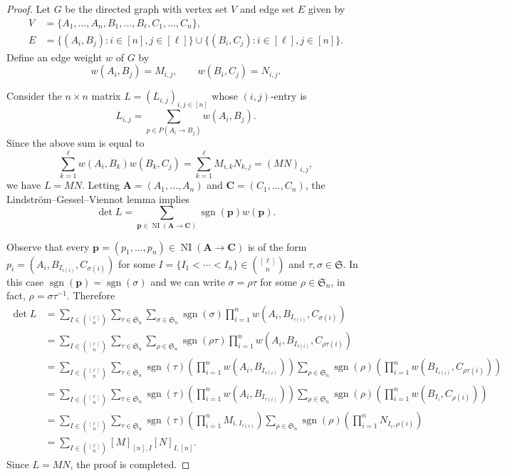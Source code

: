 \documentclass[oneside]{book}
\numberwithin{equation}{section}
\theoremstyle{definition}
\newcommand\NI{\operatorname{NI}}
\newcommand\sgn{\operatorname{sgn}}
\newcommand\sym{\mathfrak{S}}
\renewcommand\vec[1]{\mathbf{#1}}
\begin{document}
\begin{proof}
Let \( G \) be the directed graph with vertex set \( V \)
and edge set \( E \) given by
\begin{align*}
  V &= \{A_1,\dots,A_n, B_1,\dots,B_\ell, C_1,\dots,C_n\}, \\
  E &= \{(A_i,B_j): i\in [n], j\in [\ell]\} \cup
      \{(B_i,C_j): i\in [\ell], j\in [n]\}.
\end{align*}
Define an edge weight \( w \) of \( G \) by
\[
  w(A_i,B_j) = M_{i,j}, \qquad w(B_i,C_j) = N_{i,j}.
\]

Consider the \( n\times n \) matrix \( L=(L_{i,j})_{i,j\in[n]} \)
whose \( (i,j) \)-entry is
\[
  L_{i,j} = \sum_{p\in P(A_i\to B_j)} w(A_i,B_j).
\]
Since the above sum is equal to
\[
    \sum_{k=1}^{\ell} w(A_i,B_k) w(B_k,C_j)
  = \sum_{k=1}^{\ell} M_{i,k} N_{k,j} = (MN)_{i,j},
\]
we have \( L = MN \). Letting \( \vec A = (A_1,\dots,A_n) \) and
\( \vec C = (C_1,\dots,C_n) \), the Lindstr\"om--Gessel--Viennot lemma
implies
\[
  \det L = \sum_{\vec p\in \NI(\vec A \to \vec C)} 
  \sgn(\vec p) w(\vec p).
\]

Observe that every
\( \vec p = (p_1,\dots,p_{n})\in \NI(\vec A \to \vec C) \) is of the
form \( p_i = (A_i, B_{I_{\tau(i)}}, C_{\sigma(i)}) \) for some
\( I = \{I_1 < \cdots <I_n\}\in \binom{[\ell]}{n} \) and
\( \tau,\sigma\in \sym \). In this case
\( \sgn(\vec p) = \sgn(\sigma) \) and we can write
\( \sigma=\rho\tau \) for some \( \rho\in \sym_n \), in fact,
\( \rho = \sigma\tau^{-1} \).
Therefore
\begin{align*}
  \det L
  &= \sum_{I\in \binom{[\ell]}{n}} \sum_{\tau\in\sym_n} \sum_{\sigma\in\sym_n}  \sgn(\sigma) \prod_{i=1}^{n} w(A_i,B_{I_{\tau(i)}}, C_{\sigma(i)})\\
  &= \sum_{I\in \binom{[\ell]}{n}} \sum_{\tau\in\sym_n} \sum_{\rho\in\sym_n}  \sgn(\rho\tau) \prod_{i=1}^{n} w(A_i,B_{I_{\tau(i)}}, C_{\rho\tau(i)})\\
  &= \sum_{I\in \binom{[\ell]}{n}} \sum_{\tau\in\sym_n} \sgn(\tau) \left( \prod_{i=1}^{n} w(A_i,B_{I_{\tau(i)}}) \right)
    \sum_{\rho\in\sym_n}  \sgn(\rho) \left( \prod_{i=1}^{n} w(B_{I_{\tau(i)}}, C_{\rho\tau(i)}) \right)\\
  &= \sum_{I\in \binom{[\ell]}{n}} \sum_{\tau\in\sym_n} \sgn(\tau) \left( \prod_{i=1}^{n} w(A_i,B_{I_{\tau(i)}}) \right)
    \sum_{\rho\in\sym_n}  \sgn(\rho) \left( \prod_{i=1}^{n} w(B_{I_i}, C_{\rho(i)}) \right)\\
  &= \sum_{I\in \binom{[\ell]}{n}} \sum_{\tau\in\sym_n} \sgn(\tau) \left( \prod_{i=1}^{n} M_{i,I_{\tau(i)}} \right)
    \sum_{\rho\in\sym_n}  \sgn(\rho) \left( \prod_{i=1}^{n} N_{I_i,\rho(i)} \right)\\
  &= \sum_{I\in \binom{[\ell]}{n}} [M]_{[n],I} [N]_{I,[n]}.
\end{align*}
Since \( L=MN \), the proof is completed.
\end{proof}
\end{document}

